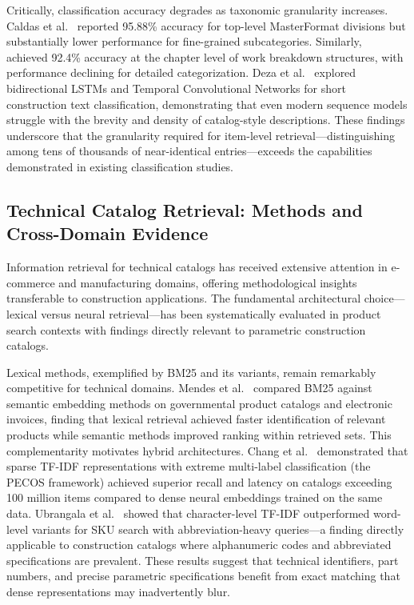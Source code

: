 \documentclass[preprint,12pt]{elsarticle}
\begin{document}
Critically, classification accuracy degrades as taxonomic granularity increases. Caldas et al.~\cite{caldasAutomatingHierarchicalDocument2003} reported 95.88\% accuracy for top-level MasterFormat divisions but substantially lower performance for fine-grained subcategories. Similarly, ~\cite{martinez-rojasApproachAutomaticClassification2015} achieved 92.4\% accuracy at the chapter level of work breakdown structures, with performance declining for detailed categorization. Deza et al.~\cite{dezaMachineLearningApproach2022} explored bidirectional LSTMs and Temporal Convolutional Networks for short construction text classification, demonstrating that even modern sequence models struggle with the brevity and density of catalog-style descriptions. These findings underscore that the granularity required for item-level retrieval—distinguishing among tens of thousands of near-identical entries—exceeds the capabilities demonstrated in existing classification studies.

\subsection{Technical Catalog Retrieval: Methods and Cross-Domain Evidence}

Information retrieval for technical catalogs has received extensive attention in e-commerce and manufacturing domains, offering methodological insights transferable to construction applications. The fundamental architectural choice—lexical versus neural retrieval—has been systematically evaluated in product search contexts with findings directly relevant to parametric construction catalogs.

Lexical methods, exemplified by BM25 and its variants, remain remarkably competitive for technical domains. Mendes et al.~\cite{mendesComparativeStudyLexical2025} compared BM25 against semantic embedding methods on governmental product catalogs and electronic invoices, finding that lexical retrieval achieved faster identification of relevant products while semantic methods improved ranking within retrieved sets. This complementarity motivates hybrid architectures. Chang et al.~\cite{changExtremeMultilabelLearning2021} demonstrated that sparse TF-IDF representations with extreme multi-label classification (the PECOS framework) achieved superior recall and latency on catalogs exceeding 100 million items compared to dense neural embeddings trained on the same data. Ubrangala et al.~\cite{ubrangalaSearchingFastSlow2024} showed that character-level TF-IDF outperformed word-level variants for SKU search with abbreviation-heavy queries—a finding directly applicable to construction catalogs where alphanumeric codes and abbreviated specifications are prevalent. These results suggest that technical identifiers, part numbers, and precise parametric specifications benefit from exact matching that dense representations may inadvertently blur.
\end{document}
